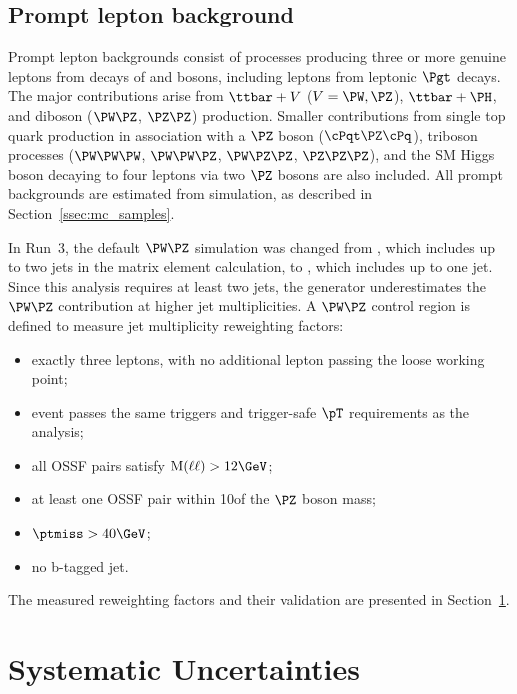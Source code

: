 \subsection{Prompt lepton background}
\label{ssec:prompt_bkg}

Prompt lepton backgrounds consist of processes producing three or more genuine leptons from decays of \PW and \PZ bosons, including leptons from leptonic $\Pgt$ decays. The major contributions arise from $\ttbar+V$ ($V = \PW, \PZ$), $\ttbar+\PH$, and diboson ($\PW\PZ$, $\PZ\PZ$) production. Smaller contributions from single top quark production in association with a $\PZ$ boson ($\cPqt\PZ\cPq$), triboson processes ($\PW\PW\PW$, $\PW\PW\PZ$, $\PW\PZ\PZ$, $\PZ\PZ\PZ$), and the SM Higgs boson decaying to four leptons via two $\PZ$ bosons are also included. All prompt backgrounds are estimated from simulation, as described in Section~\ref{ssec:mc_samples}.

In Run~3, the default $\PW\PZ$ simulation was changed from \MGvATNLO, which includes up to two jets in the matrix element calculation, to \POWHEG, which includes up to one jet. Since this analysis requires at least two jets, the \POWHEG generator underestimates the $\PW\PZ$ contribution at higher jet multiplicities. A $\PW\PZ$ control region is defined to measure jet multiplicity reweighting factors:
\begin{itemize}
  \item exactly three leptons, with no additional lepton passing the loose working point;
  \item event passes the same triggers and trigger-safe $\pT$ requirements as the analysis;
  \item all OSSF pairs satisfy $\mathrm{M}(\ell\ell) > 12\GeV$;
  \item at least one OSSF pair within 10\GeV of the $\PZ$ boson mass;
  \item $\ptmiss > 40\GeV$;
  \item no b-tagged jet.
\end{itemize}
The measured reweighting factors and their validation are presented in Section~\ref{sec:systematics}.

\section{Systematic Uncertainties}
\label{sec:systematics}

